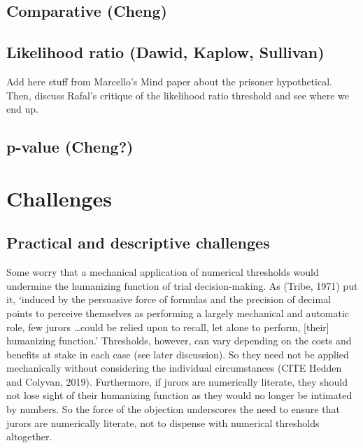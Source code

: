 \documentclass[10pt,dvipsnames]{scrartcl}
\begin{document}
\subsection{Comparative (Cheng)}\label{comparative-cheng}

\subsection{Likelihood ratio (Dawid, Kaplow,
Sullivan)}\label{likelihood-ratio-dawid-kaplow-sullivan}

Add here stuff from Marcello's Mind paper about the prisoner
hypothetical. Then, discuss Rafal's critique of the likelihood ratio
threshold and see where we end up.

\subsection{p-value (Cheng?)}\label{p-value-cheng}

\section{Challenges}\label{challenges}

\subsection{Practical and descriptive
challenges}\label{practical-and-descriptive-challenges}

Some worry that a mechanical application of numerical thresholds would
undermine the humanizing function of trial decision-making. As (Tribe,
1971) put it, `induced by the persuasive force of formulas and the
precision of decimal points to perceive themselves as performing a
largely mechanical and automatic role, few jurors \dots could be relied
upon to recall, let alone to perform, {[}their{]} humanizing function.'
Thresholds, however, can vary depending on the costs and benefits at
stake in each case (see later discussion). So they need not be applied
mechanically without considering the individual circumstances (CITE
Hedden and Colyvan, 2019). Furthermore, if jurors are numerically
literate, they should not lose sight of their humanizing function as
they would no longer be intimated by numbers. So the force of the
objection underscores the need to ensure that jurors are numerically
literate, not to dispense with numerical thresholds altogether.
\end{document}
